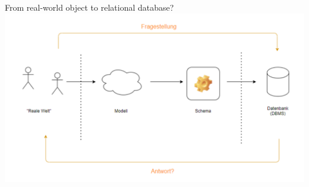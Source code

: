 
\begin{frame}{From real-world object to relational database?}
    \includegraphics[width=\textwidth]{img/von-welt-zu-db.png}
\end{frame}

